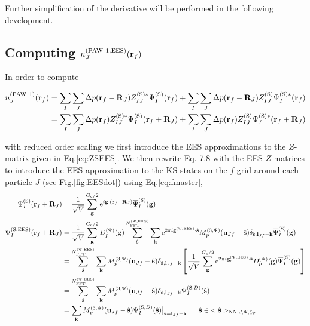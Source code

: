 \documentclass[paper=a4, fontsize=11pt]{article} %
\numberwithin{equation}{section} %
\numberwithin{figure}{section} %
\numberwithin{table}{section} %
\newcommand{\bu}{{\bf{u}}}
\newcommand{\bl}{{\bf{l}}}
\newcommand{\bk}{{\bf{k}}}
\newcommand{\bs}{{\bf{s}}}
\newcommand{\bg}{{\bf{g}}}
\newcommand{\br}{{\bf{r}}}
\newcommand{\bR}{{\bf{R}}}
\newcommand{\hs}{{\hat{\bf{s}}}}
\newcommand{\rS}{{\mathrm{S}}}
\newcommand{\rEES}{{\mathrm{EES}}}
\newcommand{\rNN}{{\mathrm{NN}}}
\newcommand{\re}{{\mathrm{e}}}
\newcommand{\rP}{{\mathrm{PAW}}}
\newcommand{\gcpEES}{{\bg_c^{(\Psi,\rEES)}}}
\newcommand{\psigs}{{\overline \Psi_I^{(\rS)}(\bg)}}
\newcommand{\NFFTpEES}{{N^{\mathrm{(\Psi,\rEES})}_{\mathrm{FFT}}}}
\newcommand{\Gc}{{G_{\mathrm{c}}}}
\newcommand{\Dpg}{{D^{(\Psi)}_p(\bg)}}
\newcommand{\Mp}{{M_p^{(3,\Psi)}}}
\newcommand{\hsJp}{{<\hs>_{\rNN,J,\Psi,\zeta_\Psi}}}
\newcommand{\hsinJp}{{\ \ \ \ \ \hs  \in  \hsJp}}
\begin{document}
Further simplification of the derivative will be performed in the following development. 


\subsection{Computing $n_J^{(\rP\ 1,\rEES)}(\br_f)$}
In order to compute 

\begin{equation}\label{eq:n1rf}
\begin{split}
n_J^{(\rP\ 1)}(\br_f)
&=\sum_I \sum_J \Delta p(\br_f-\bR_J) Z_{IJ}^{(\rS)*} \Psi_I^{(\rS)}(\br_f) + \sum_I \sum_J \Delta p(\br_f-\bR_J) Z_{IJ}^{(\rS)} \Psi_I^{(\rS)*}(\br_f)\\
&= \sum_I \sum_J \Delta p(\br_f) Z_{IJ}^{(\rS)*} \Psi_I^{(\rS)}(\br_f+\bR_J) + \sum_I \sum_J \Delta p(\br_f) Z_{IJ}^{(\rS)} \Psi_I^{(\rS)*}(\br_f+\bR_J)\\
\end{split}
\end{equation}

with reduced order scaling we first introduce the EES approximations to the $Z$-matrix given in Eq.\eqref{eq:ZSEES}. We then rewrite Eq. 7.8 with the EES $Z$-matrices to introduce the EES approximation to the KS states on the $f$-grid around each particle $J$ (see Fig.\ref{fig:EESdot}) using Eq.\eqref{eq:fmaster},
\begin{equation}
\begin{split}
\Psi_I^{(\rS)}(\br_f+\bR_J) 
&= \frac{1}{\sqrt V} \sum_{\bg}^{\Gc/2} \re^{i\bg\cdot(\br_f+\bR_J)} \psigs \\
\Psi_I^{(\rS,\rEES)}(\br_f+\bR_J)
&= \frac{1}{\sqrt V} \sum_{\bg}^{\Gc/2} \Dpg\sum_{\hat \bs}^{\NFFTpEES} \sum_{\bk} \re^{2\pi i\gcpEES \cdot \hat\bs} \Mp(\bu_{Jf}-\hat \bs)\delta_{\hat \bs,\bl_{Jf}-\bk}\psigs \\
&= \sum_{\hat \bs}^{\NFFTpEES} \sum_{\bk} \Mp(\bu_{Jf}-\hat \bs)\delta_{\hat \bs,\bl_{Jf}-\bk} \left[\frac{1}{\sqrt V} \sum_{\bg}^{\Gc/2} \re^{2\pi i\gcpEES \cdot \hat\bs}  \Dpg \psigs \right] \\
&= \sum_{\hat \bs}^{\NFFTpEES} \sum_{\bk} \Mp(\bu_{Jf}-\hat \bs)\delta_{\hat \bs,\bl_{Jf}-\bk} \Psi_I^{(\rS,D)}(\hat \bs)\\
&= \sum_{\bk} \Mp(\bu_{Jf}-\hat \bs) \Psi_I^{(\rS,D)}(\hat \bs)\big|_{\hat \bs=\bl_{Jf}-\bk}\hsinJp \\
\end{split}
\end{equation}
\end{document}
